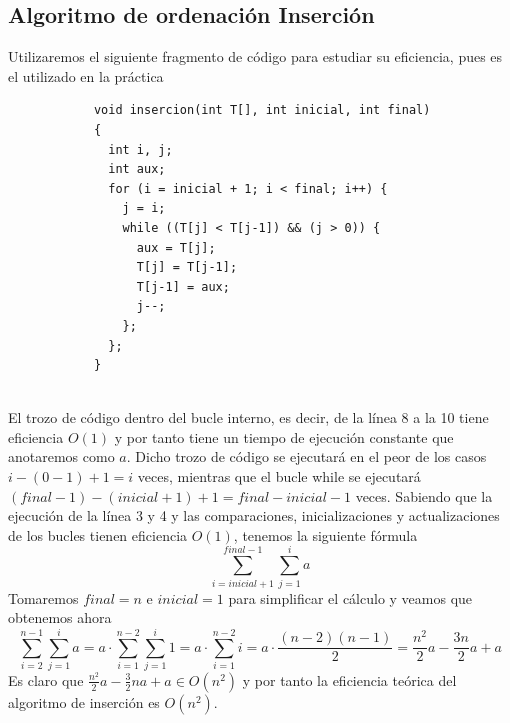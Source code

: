 \documentclass[11pt]{article}
\begin{document}
        \subsection*{Algoritmo de ordenación Inserción}
        Utilizaremos el siguiente fragmento de código para estudiar su eficiencia, pues es el utilizado en la práctica
        \begin{lstlisting}
            void insercion(int T[], int inicial, int final)
            {
              int i, j;
              int aux;
              for (i = inicial + 1; i < final; i++) {
                j = i;
                while ((T[j] < T[j-1]) && (j > 0)) {
                  aux = T[j];
                  T[j] = T[j-1];
                  T[j-1] = aux;
                  j--;
                };
              };
            }
            
        \end{lstlisting}
        El trozo de código dentro del bucle interno, es decir, de la línea 8 a la 10 tiene eficiencia $O(1)$ y por tanto
        tiene un tiempo de ejecución constante que anotaremos como $a$. Dicho trozo de código se ejecutará en el peor de los casos
        $i-(0-1)+1=i$ veces, mientras que el bucle while se ejecutará $(final-1)-(inicial+1)+1=final-inicial-1$ veces.
        Sabiendo que la ejecución de la línea 3 y 4 y las comparaciones, inicializaciones y actualizaciones de los bucles tienen eficiencia $O(1)$, 
        tenemos la siguiente fórmula
        \begin{equation*}
            \sum_{i=inicial+1}^{final-1} \sum_{j=1}^{i}a
        \end{equation*}
        Tomaremos $final =  n$ e $inicial = 1$ para simplificar el cálculo y veamos que obtenemos ahora
        \begin{equation*}
            \sum_{i=2}^{n-1} \sum_{j=1}^{i}a= a \cdot \sum_{i=1}^{n-2} \sum_{j=1}^{i}1= a \cdot \sum_{i=1}^{n-2} i
            = a \cdot \frac{(n-2)(n-1)}{2}=\frac{n^2}{2}a-\frac{3n}{2}a+a 
        \end{equation*}
        Es claro que $\frac{n^2}{2}a-\frac{3}{2}na+a \in O(n^2)$ y por tanto la eficiencia teórica del algoritmo de inserción es $O(n^2)$.
\end{document}
